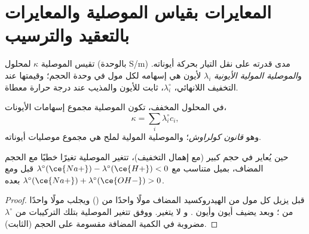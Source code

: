 \section{المعايرات بقياس الموصلية والمعايرات بالتعقيد والترسيب}

\begin{definition}\label{def:b1:titration-methods:conductivity}
تقيس الموصلية $\kappa$ لمحلول (بالوحدة \unit{S/m}) مدى قدرته
على نقل التيار بحركة أيوناته. و\emph{الموصلية المولية
الأيونية} $\lambda_i$ لأيون هي
إسهامه لكل مول في وحدة الحجم؛ وقيمتها عند التخفيف اللانهائي،
$\lambda_i^\circ$، ثابت للأيون والمذيب عند درجة حرارة
معطاة.
\end{definition}

\begin{proposition}\label{prop:b1:titration-methods:kohlrausch}
في المحلول المخفف، تكون الموصلية مجموع إسهامات
الأيونات،
\[
  \kappa = \sum_i \lambda_i^\circ c_i ,
\]
وهو \emph{قانون كولراوش}؛ والموصلية المولية
لملح هي مجموع موصليات أيوناته.
\end{proposition}


\begin{proposition}\label{prop:b1:titration-methods:conductimetric-slopes}
حين يُعاير   
 في حجم كبير (مع إهمال التخفيف)، تتغير الموصلية
تغيرًا خطيًا مع الحجم المضاف، بميل متناسب مع
$\lambda^\circ(\ce{Na+}) - \lambda^\circ(\ce{H+}) < 0$ قبل
 ومع $\lambda^\circ(\ce{Na+}) + \lambda^\circ(\ce{OH-}) > 0$
بعده.
\end{proposition}

\begin{proof}
قبل  يزيل كل مول من الهيدروكسيد المضاف مولًا واحدًا من
 () ويجلب مولًا واحدًا من ؛ وبعد
 يضيف أيون  وأيون . و لا يتغير.
ووفق  تتغير الموصلية بتلك التركيبات من
$\lambda^\circ$ مضروبة في الكمية المضافة مقسومة على الحجم (الثابت).
\end{proof}

